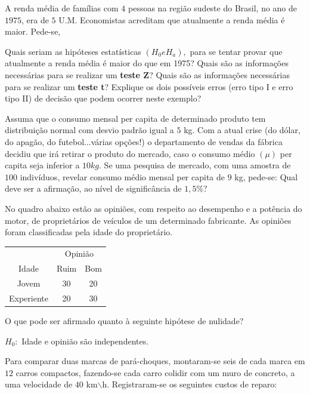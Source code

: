 \documentclass{report}
\begin{document}
\begin{Exercise}
\Question A renda média de famílias com $4$ pessoas na região sudeste do Brasil, no ano de $1975$, era de $5$ U.M. Economistas acreditam que atualmente a renda 
média é maior. Pede-se,
\begin{tasks}
\task Quais seriam as hipóteses estatísticas $(H_{0} e H_{a}),$ para se tentar provar que atualmente a renda média é maior do que em 1975?
\task Quais são as informações necessárias para se realizar um \textbf{teste Z}?
\task Quais são as informações necessárias para se realizar um \textbf{teste t}?
\task Explique os dois possíveis erros (erro tipo I e erro tipo II) de decisão que podem ocorrer neste exemplo?
\end{tasks}

\Question Assuma que o consumo mensal per capita de determinado produto tem distribuição normal com desvio padrão igual a $5$ kg. Com a atual crise (do dólar, 
do apagão, do futebol...várias opções!) o departamento de vendas da fábrica decidiu que irá retirar o produto do mercado, caso o consumo médio $(\mu)$ per capita 
seja inferior a $10 kg.$ Se uma pesquisa de mercado, com uma amostra de $100$ indivíduos, revelar consumo médio mensal per capita de $9$ kg, pede-se: Qual deve 
ser a afirmação, ao nível de significância de $1,5\%$?

\Question No quadro abaixo estão as opiniões, com respeito ao desempenho e a potência do motor, de proprietários de veículos de um determinado fabricante. 
As opiniões foram classificadas pela idade do proprietário.

\begin{table}[H]
\centering
\begin{tabular}{ccc}
\hline \hline
                                      &\multicolumn{2}{c}{Opinião}\\
																			\cline{2-3}
Idade&Ruim&Bom\\
\hline\hline
Jovem       & 30  &20      \\
Experiente& 20  &30     \\
\hline
\end{tabular}
\end{table}

O que pode ser afirmado quanto à seguinte hipótese de nulidade? 

$H_{0}:$ Idade e opinião são independentes.

\Question Para comparar duas marcas de pará-choques, montaram-se seis de cada marca em $12$ carros compactos, fazendo-se cada carro colidir com um muro 
de concreto, a uma velocidade de $40$ km$\backslash$h. Registraram-se os seguintes custos de reparo:


\end{Exercise}
\end{document}
